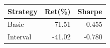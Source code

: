 {\tiny\setlength{\tabcolsep}{2pt}\begin{tabular}{lrr} \toprule
Strategy & Ret(\%) & Sharpe \\ \midrule
Basic & -71.51 & -0.455 \\ 
Interval & -41.02 & -0.780 \\ 
\bottomrule \end{tabular}}